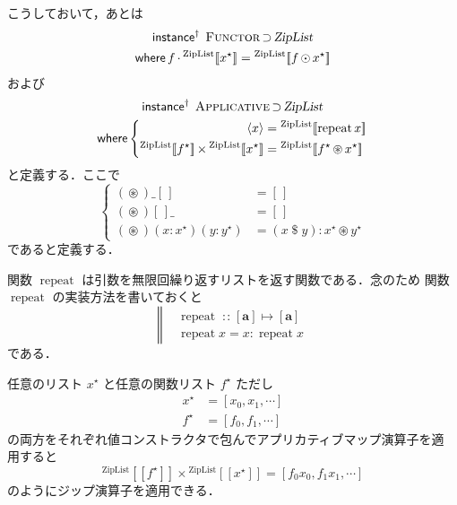 \documentclass[a5paper,twoside,fleqn,draft]{jsbook}
\def\[{[\![}
\def\]{]\!]}
\newcommand{\mBrace}{\Vert}
\newcommand{\mKeyword}[1]{\mathsf{#1}}
\newcommand{\mInstanceDeclKeyword}{\mKeyword{instance}}
\newcommand{\mWhereKeyword}{\mKeyword{where}}
\DeclareMathOperator{\mInstanceDeclPolymorphic}{\mInstanceDeclKeyword^{\dagger}}
\DeclareMathOperator{\mSuperSet}{\supset}
\DeclareMathOperator{\mWhere}{\mWhereKeyword}
\newcommand{\mEmptyList}{{[\,]}}
\newcommand{\mSpecialFunc}[1]{#1}
\DeclareMathOperator{\mRepeat}{\mSpecialFunc{repeat}}
\DeclareMathOperator{\mApply}{\$}
\DeclareMathOperator{\mAppMap}{\times}
\DeclareMathOperator{\mIn}{{:\!:}}
\DeclareMathOperator{\mMap}{\cdot}
\DeclareMathOperator{\mMapList}{\odot}
\DeclareMathOperator{\mMapsTo}{\mapsto}
\DeclareMathOperator{\mZip}{\circledast}
\newcommand{\mType}[1]{\mathbf{#1}} %
\newcommand{\mA}{\mType{a}}
\newcommand{\mTypeConstructor}[1]{\textsl{#1}}
\DeclareMathOperator{\mZipListTypeConstructor}{\mTypeConstructor{ZipList}}
\newcommand{\mValueConstructor}[1]{\mathrm{#1}}
\newcommand{\mValueWith}[2]{{}^\mValueConstructor{#1}\[#2\]}
\newcommand{\mZipListWith}[1]{\mValueWith{ZipList}{#1}}
\newcommand{\mPureWith}[1]{\langle#1\rangle}
\newcommand{\mTypeClass}[1]{\textsc{#1}} %
\newcommand{\mApplicativeTypeClass}{\mTypeClass{Applicative}}
\newcommand{\mFunctorTypeClass}{\mTypeClass{Functor}}
\newcommand{\mList}[1]{{#1}^\mathrm{\star}}
\newcommand{\mProjEXP}[2]{#1\mMapsTo#2} %
\begin{document}
こうしておいて，あとは
\begin{multline}
  \mInstanceDeclPolymorphic\;
  \mFunctorTypeClass\mSuperSet\mZipListTypeConstructor\\
  \mWhere
  f\mMap{}\mZipListWith{\mList{x}}=\mZipListWith{f\mMapList\mList{x}}
\end{multline}
および
\begin{multline}
  \mInstanceDeclPolymorphic\;
  \mApplicativeTypeClass\mSuperSet\mZipListTypeConstructor\\
  \mWhere
  \left\{
  \begin{aligned}
    \mPureWith{x}
    &=\mZipListWith{\mRepeat x}\\
    \mZipListWith{\mList{f}}\mAppMap\mZipListWith{\mList{x}}
    &=\mZipListWith{\mList{f}\mZip\mList{x}}
  \end{aligned}
  \right.
\end{multline}
と定義する．ここで
\begin{equation}
  \label{eq:zip}
  \left\{
  \begin{aligned}
    (\mZip)\_\mEmptyList&=\mEmptyList\\
    (\mZip)\mEmptyList\_&=\mEmptyList\\
    (\mZip)(x:\mList{x})(y:\mList{y})&=(x\mApply y):\mList{x}\mZip\mList{y}
  \end{aligned}
  \right.
\end{equation}
であると定義する．

関数 $\mRepeat$ は引数を無限回繰り返すリストを返す関数である．念のため
関数 $\mRepeat$ の実装方法を書いておくと
\begin{equation}
  \left\mBrace
  \begin{aligned}
    &\mRepeat\mIn{}\mProjEXP{[\mA]}{[\mA]}\\
    &\mRepeat x=x:\mRepeat x
  \end{aligned}
  \right.
\end{equation}
である．

任意のリスト $\mList{x}$ と任意の関数リスト $\mList{f}$ ただし
\begin{align}
\mList{x}&=[x_0,x_1,\dotsb]\\
\mList{f}&=[f_0,f_1,\dotsb]
\end{align}
の両方をそれぞれ値コンストラクタで包んでアプリカティブマップ演算子を適
用すると
\begin{equation}
  \mZipListWith{\mList{f}}\mAppMap\mZipListWith{\mList{x}}
  =[f_0x_0,f_1x_1,\dotsb]
\end{equation}
のようにジップ演算子を適用できる．
\end{document}
